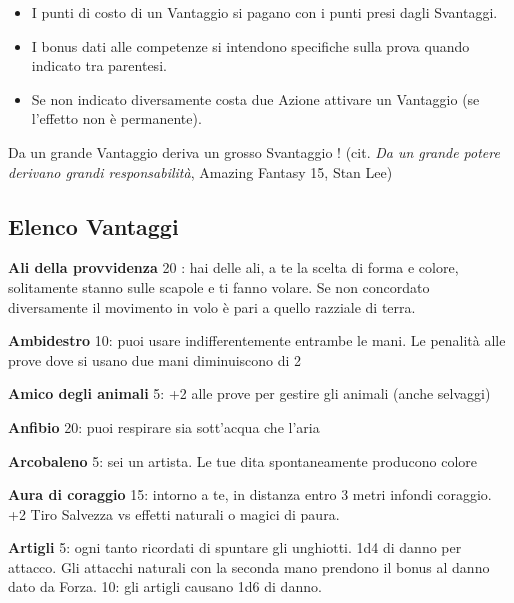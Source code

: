 \documentclass[a4paper,twoside,openany]{book}
\begin{document}
\begin{multicols}{2}
\begin{itemize}[leftmargin=*]
\item
I punti di costo di un Vantaggio si pagano con i punti presi dagli Svantaggi.

\item
I bonus dati alle competenze si intendono specifiche sulla prova quando indicato tra parentesi.

\item Se non indicato diversamente costa due Azione attivare un Vantaggio (se l'effetto non è permanente).

\end{itemize}


\begin{changemargin}{0.3cm}{0.3cm}\begin{enfasi}{
Da un grande Vantaggio deriva un grosso Svantaggio ! (cit. \emph{Da un grande potere derivano grandi responsabilità}, Amazing Fantasy 15, Stan Lee)
}\end{enfasi}\end{changemargin}\medskip


\subsection{Elenco Vantaggi}

\textbf{Ali della provvidenza} 20 : hai delle ali, a te la scelta di forma e colore, solitamente stanno sulle scapole e ti fanno volare. Se non concordato diversamente il movimento in volo è pari a quello razziale di terra.

\textbf{Ambidestro} 10: puoi usare indifferentemente entrambe le mani. Le penalità alle prove dove si usano due mani diminuiscono di 2

\textbf{Amico degli animali} 5: +2 alle prove per gestire gli animali (anche selvaggi)

\textbf{Anfibio} 20: puoi respirare sia sott'acqua che l'aria

\textbf{Arcobaleno} 5: sei un artista. Le tue dita spontaneamente producono colore

\textbf{Aura di coraggio} 15: intorno a te, in distanza entro 3 metri infondi coraggio. +2 Tiro Salvezza vs effetti naturali o magici di paura.

\textbf{Artigli} 5: ogni tanto ricordati di spuntare gli unghiotti. 1d4 di danno per attacco. Gli attacchi naturali con la seconda mano prendono il bonus al danno dato da Forza.
10: gli artigli causano 1d6 di danno.


\end{multicols}
\end{document}
